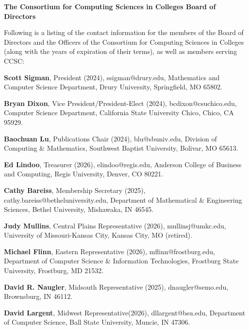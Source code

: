 \documentclass{article}
\begin{document}
\begingroup
  \centering
  \textbf{\large The Consortium for Computing Sciences in Colleges Board of Directors\\}
\endgroup

\begin{multicols}{2}
\begin{raggedright}

\small{

\noindent
Following is a listing of the contact information for the members of the Board
of Directors and the Officers of the Consortium for Computing Sciences in
Colleges (along with the years of expiration of their terms), as well as members
serving CCSC:

\noindent
\textbf{Scott Sigman}, President (2024), ssigman@drury.edu,
Mathematics and Computer Science Department, Drury University, Springfield, MO 65802.

\noindent
\textbf{Bryan Dixon}, Vice President/President-Elect (2024),
bcdixon@csuchico.edu, Computer Science Department, California State University Chico, Chico, CA 95929.

\noindent
\textbf{Baochuan Lu}, Publications Chair (2024),
blu@sbuniv.edu, Division of Computing \& Mathematics, Southwest Baptist University, Bolivar, MO 65613.

\noindent
\textbf{Ed Lindoo}, Treasurer (2026), elindoo@regis.edu,
Anderson College of Business and Computing, Regis University, Denver, CO 80221.

\noindent
\textbf{Cathy Bareiss}, Membership Secretary (2025), cathy.bareiss@betheluniversity.edu,
Department of Mathematical \& Engineering Sciences, Bethel University, Mishawaka, IN 46545.

\noindent
\textbf{Judy Mullins}, Central Plains Representative (2026), mullinsj@umkc.edu, University of Missouri-Kansas City, Kansas City, MO (retired).

\noindent
\textbf{Michael Flinn}, Eastern Representative (2026), mflinn@frostburg.edu,
Department of Computer Science \& Information Technologies,
Frostburg State University, Frostburg, MD 21532.

\vspace{10pt}
\noindent
\textbf{David R. Naugler}, Midsouth Representative (2025),
dnaugler@semo.edu, Brownsburg, IN 46112.

\noindent
\textbf{David Largent}, Midwest Representative(2026), dllargent@bsu.edu,
Department of Computer Science,
Ball State University,
Muncie, IN 47306.

}
\end{raggedright}
\end{multicols}
\end{document}
